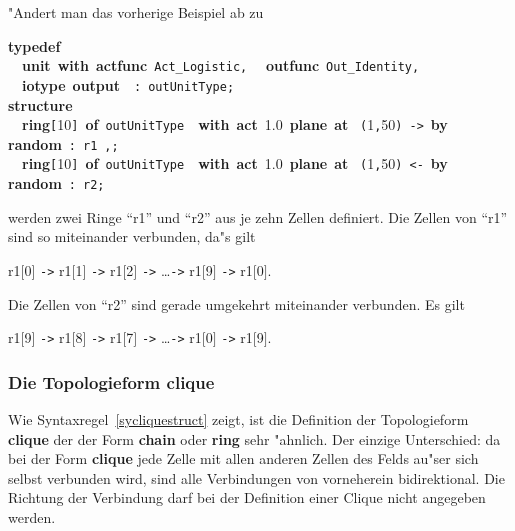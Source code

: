 "Andert man das vorherige Beispiel ab zu\\
\begin{tabbing}
{\bf typedef}\\
~~{\bf unit}~{\bf with}~{\bf actfunc}~\verb&Act_Logistic&\verb&,&~~{\bf
	outfunc}~\verb&Out_Identity&\verb&,&\\
~~{\bf iotype}~{\bf output}~~\verb&:&~\verb&outUnitType&\verb&;&\\[.15cm]
{\bf structure}\\
~~{\bf ring}\verb&[&10\verb&]&~{\bf of}~\verb&outUnitType&~~{\bf with}~{\bf act}~1.0~{\bf plane}~{\bf at}~
	\verb&(&1\verb&,&50\verb&)&~\verb&->&~{\bf by random}~\verb&:&~\verb&r1&~\verb&,&\verb&;&\\
~~{\bf ring}\verb&[&10\verb&]&~{\bf of}~\verb&outUnitType&~~{\bf with}~{\bf act}~1.0~{\bf plane}~{\bf at}~
	\verb&(&1\verb&,&50\verb&)&~\verb&<-&~{\bf by random}~\verb&:&~\verb&r2&\verb&;&\\
\end{tabbing}
werden zwei Ringe ``r1'' und ``r2'' aus je zehn Zellen definiert. Die
Zellen von ``r1'' sind so miteinander verbunden, da"s gilt\\
\centerline{r1$[$0$]$ \verb&->& r1$[$1$]$ \verb&->& r1$[$2$]$
\verb&->& \ldots \verb&->& r1$[$9$]$ \verb&->& r1$[$0$]$.} Die Zellen
von ``r2'' sind gerade umgekehrt miteinander verbunden. Es gilt\\
\centerline{r1$[$9$]$ \verb&->& r1$[$8$]$ \verb&->& r1$[$7$]$
\verb&->& \ldots \verb&->& r1$[$0$]$ \verb&->& r1$[$9$]$.}

\subsubsection{Die Topologieform {\bf clique}}

  Wie
Syntaxregel~\ref{sycliquestruct} zeigt, ist die Definition der
Topologieform {\bf clique} der der Form {\bf
chain} oder {\bf ring} sehr "ahnlich. Der
einzige Unterschied: da bei der Form {\bf clique} jede
Zelle mit allen anderen Zellen des Felds au"ser sich selbst verbunden
wird, sind alle Verbindungen von vorneherein
bidirektional. Die Richtung der Verbindung darf
bei der Definition einer Clique nicht angegeben werden.

